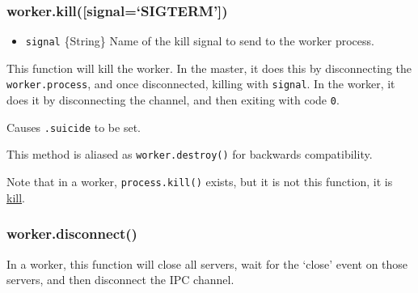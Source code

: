 \begin{Shaded}
\begin{Highlighting}[]
 \NormalTok{(}\NormalTok{) \{}
   \NormalTok{();}
  \NormalTok{(}\NormalTok{);}

\NormalTok{\} }  \NormalTok{(}\NormalTok{) \{}
  \NormalTok{(}\NormalTok{, }
  \NormalTok{\});}
\NormalTok{\}}
\end{Highlighting}
\end{Shaded}

\subsubsection{worker.kill({[}signal=`SIGTERM'{]})}\label{worker.killsignalsigterm}

\begin{itemize}
\itemsep1pt\parskip0pt
\item
  \texttt{signal} \{String\} Name of the kill signal to send to the
  worker process.
\end{itemize}

This function will kill the worker. In the master, it does this by
disconnecting the \texttt{worker.process}, and once disconnected,
killing with \texttt{signal}. In the worker, it does it by disconnecting
the channel, and then exiting with code \texttt{0}.

Causes \texttt{.suicide} to be set.

This method is aliased as \texttt{worker.destroy()} for backwards
compatibility.

Note that in a worker, \texttt{process.kill()} exists, but it is not
this function, it is
\href{process.html\#process_process_kill_pid_signal}{kill}.

\subsubsection{worker.disconnect()}\label{worker.disconnect}

In a worker, this function will close all servers, wait for the `close'
event on those servers, and then disconnect the IPC channel.

